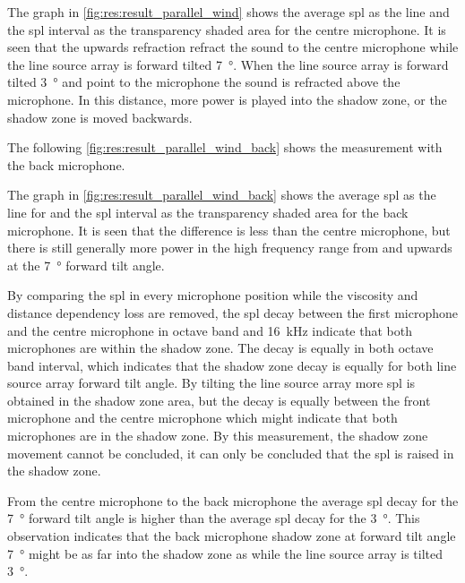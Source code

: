   
  
 
 
 The graph in \autoref{fig:res:result_parallel_wind} shows the average \gls{spl} as the line  and the \gls{spl} interval as the transparency shaded area for the centre microphone. It is seen that the upwards refraction refract the sound to the centre microphone while the line source array is forward tilted \SI{7}{\degree}. When the line source array is forward tilted \SI{3}{\degree} and point to the microphone the sound is refracted above the microphone. In this distance, more power is played into the shadow zone, or the shadow zone is moved backwards. 

The following \autoref{fig:res:result_parallel_wind_back} shows the measurement with the back microphone.
 
 
  
   
The graph in \autoref{fig:res:result_parallel_wind_back} shows the average \gls{spl} as the line for and the \gls{spl} interval as the transparency shaded area for the back microphone. It is seen that the difference is less than the centre microphone, but there is still generally more power in the high frequency range from  and upwards at the \SI{7}{\degree} forward tilt angle.   


By comparing the \gls{spl} in every microphone position while the viscosity and distance dependency loss are removed, the \gls{spl} decay between the first microphone and the centre microphone in octave band  and \SI{16}{\kilo\hertz} indicate that both microphones are within the shadow zone. The decay is equally in both octave band interval, which indicates that the shadow zone decay is equally for both line source array forward tilt angle. By tilting the line source array more \gls{spl} is obtained in the shadow zone area, but the decay is equally between the front microphone and the centre microphone which might indicate that both microphones are in the shadow zone. By this measurement, the shadow zone movement cannot be concluded, it can only be concluded that the \gls{spl} is raised in the shadow zone. 

From the centre microphone to the back microphone the average \gls{spl} decay for the \SI{7}{\degree} forward tilt angle is higher than the average \gls{spl} decay for the \SI{3}{\degree}. This observation indicates that the back microphone shadow zone at forward tilt angle \SI{7}{\degree} might be as far into the shadow zone as while the line source array is tilted \SI{3}{\degree}.